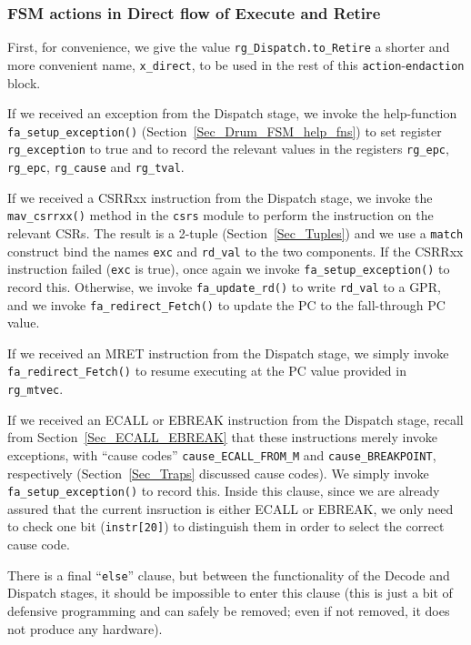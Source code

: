 
\subsubsection{FSM actions in Direct flow of Execute and Retire}


First, for convenience, we give the value \verb|rg_Dispatch.to_Retire|
a shorter and more convenient name, \verb|x_direct|, to be used in the
rest of this \verb|action|-\verb|endaction| block.

If we received an exception from the Dispatch stage, we invoke the
help-function \verb|fa_setup_exception()|
(Section~\ref{Sec_Drum_FSM_help_fns}) to set register
\verb|rg_exception| to true and to record the relevant values in the
registers \verb|rg_epc|, \verb|rg_epc|, \verb|rg_cause| and
\verb|rg_tval|.

If we received a CSRRxx instruction from the Dispatch stage, we invoke
the \verb|mav_csrrxx()| method in the \verb|csrs| module to perform
the instruction on the relevant CSRs.  The result is a 2-tuple
(Section~\ref{Sec_Tuples}) and we use a \verb|match| construct bind
the names \verb|exc| and \verb|rd_val| to the two components.  If the
CSRRxx instruction failed (\verb|exc| is true), once again we invoke
\verb|fa_setup_exception()| to record this.  Otherwise, we invoke
\verb|fa_update_rd()| to write \verb|rd_val| to a GPR, and we invoke
\verb|fa_redirect_Fetch()| to update the PC to the fall-through PC
value.

If we received an MRET instruction from the Dispatch stage, we simply
invoke \verb|fa_redirect_Fetch()| to resume executing at the PC value
provided in \verb|rg_mtvec|.

If we received an ECALL or EBREAK instruction from the Dispatch stage,
recall from Section~\ref{Sec_ECALL_EBREAK} that these instructions
merely invoke exceptions, with ``cause codes''
\verb|cause_ECALL_FROM_M| and \verb|cause_BREAKPOINT|, respectively
(Section~\ref{Sec_Traps} discussed cause codes).  We simply invoke
\verb|fa_setup_exception()| to record this.  Inside this clause, since
we are already assured that the current insruction is either ECALL or
EBREAK, we only need to check one bit (\verb|instr[20]|) to
distinguish them in order to select the correct cause code.

There is a final ``\verb|else|'' clause, but between the functionality
of the Decode and Dispatch stages, it should be impossible to enter
this clause (this is just a bit of defensive programming and can
safely be removed; even if not removed, it does not produce any
hardware).

